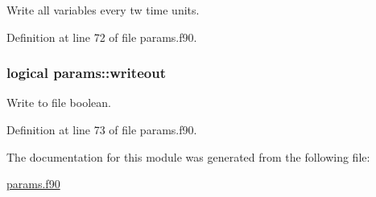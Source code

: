 Write all variables every tw time units. 



Definition at line 72 of file params.\-f90.

\hypertarget{classparams_affc7b423a975c0e92b62e67ed04edea5}{
\subsubsection[{writeout}]{\setlength{\rightskip}{0pt plus 5cm}logical params\-::writeout}}\label{classparams_affc7b423a975c0e92b62e67ed04edea5}


Write to file boolean. 



Definition at line 73 of file params.\-f90.



The documentation for this module was generated from the following file\-:\begin{DoxyCompactItemize}
\item 
\hyperlink{params_8f90}{params.\-f90}\end{DoxyCompactItemize}
